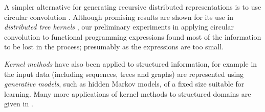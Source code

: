 A simpler alternative for generating recursive distributed representations is to use circular convolution \citep{conf/ijcai/Plate91}. Although promising results are shown for its use in \emph{distributed tree kernels} \citep{zanzotto2012distributed}, our preliminary experiments in applying circular convolution to functional programming expressions found most of the information to be lost in the process; presumably as the expressions are too small.

\emph{Kernel methods} have also been applied to structured information, for example in \citep{Gartner2003} the input data (including sequences, trees and graphs) are represented using \emph{generative models}, such as hidden Markov models, of a fixed size suitable for learning. Many more applications of kernel methods to structured domains are given in \citep{bakir2007predicting}.
